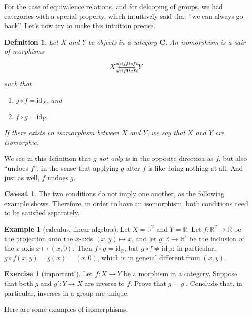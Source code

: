 \documentclass[12pt,oneside,headings=small]{scrbook}
\numberwithin{equation}{section}
\theoremstyle{plain}
\newtheorem{deph}[thm]{Definition}
\theoremstyle{definition}
\newtheorem{eg}[thm]{Example}
\newtheorem*{caveat}{Caveat}
\newtheorem{ex}[thm]{Exercise}
\newcommand{\R}{\mathbb{R}}
\newcommand{\cat}[1]{{\mathbf{#1}}} %
\newcommand{\ar}[2][]{\arrow{#2}{#1}}
\DeclareMathOperator{\1}{\mathbbm{1}}
\DeclareMathOperator{\2}{\mathbbm{2}}
\newcommand{\id}{\mathrm{id}} %
\begin{document}
For the case of equivalence relations, and for delooping of groups, we had categories with a special property, which intuitively said that ``we can always go back''. Let's now try to make this intuition precise.

\begin{deph}\label{defiso}
 Let $X$ and $Y$ be objects in a category $\cat{C}$. An \emph{isomorphism} is a pair of morphisms 
 $$
 \begin{tikzcd}
  X \ar[shift left]{r}{f} & Y \ar[shift left]{l}{g}
 \end{tikzcd}
 $$
 such that 
 \begin{enumerate}
  \item $g\circ f = \id_X$, and
  \item $f\circ g = \id_Y$. 
 \end{enumerate}
 If there exists an isomorphism between $X$ and $Y$, we say that $X$ and $Y$ are \emph{isomorphic}.
\end{deph}

We see in this definition that $g$ \emph{not only} is in the opposite direction as $f$, but also ``undoes $f$'', in the sense that applying $g$ after $f$ is like doing nothing at all. And just as well, $f$ undoes $g$.

\begin{caveat}
 The two conditions do not imply one another, as the following example shows. Therefore, in order to have an isomorphism, both conditions need to be satisfied separately.
\end{caveat}

\begin{eg}[calculus, linear algebra]
 Let $X=\R^2$ and $Y=\R$. Let $f:\R^2\to \R$ be the projection onto the $x$-axis $(x,y)\mapsto x$, and let $g:\R\to \R^2$ be the inclusion of the $x$-axis $x\mapsto (x,0)$. Then $f\circ g = \id_{\R}$, but $g\circ f \ne \id_{\R^2}$: in particular, $g\circ f(x,y) = g(x) = (x,0)$, which is in general different from $(x,y)$. 
\end{eg}

\begin{ex}[important!]
 Let $f:X\to Y$ be a morphism in a category. Suppose that both $g$ and $g':Y\to X$ are inverse to $f$. Prove that $g=g'$. Conclude that, in particular, inverses in a group are unique. 
\end{ex}

Here are some examples of isomorphisms.
\end{document}
